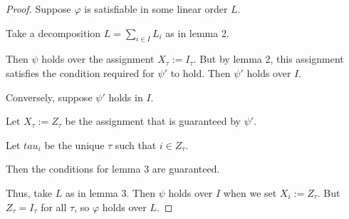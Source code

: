 \documentclass{article}
\begin{document}
\begin{proof}
  Suppose $\varphi$ is satisfiable in some linear order $L$.

  Take a decomposition $L = \sum_{i \in I} L_i$ as in lemma 2.

  Then $\psi$ holds over the assignment $X_\tau := I_\tau$. But by lemma 2, this assignment
  satisfies the condition required for $\psi'$ to hold. Then $\psi'$ holds over $I$.

  Conversely, suppose $\psi'$ holds in $I$.

  Let $X_\tau := Z_\tau$ be the assignment that is guaranteed by $\psi'$.

  Let $tau_i$ be the unique $\tau$ such that $i \in Z_\tau$.

  Then the conditions for lemma 3 are guaranteed.

  Thus, take $L$ as in lemma 3. Then $\psi$ holds over $I$ when we set $X_i := Z_\tau$.
  But $Z_\tau = I_\tau$ for all $\tau$, so $\varphi$ holds over $L$.
\end{proof}
\end{document}
